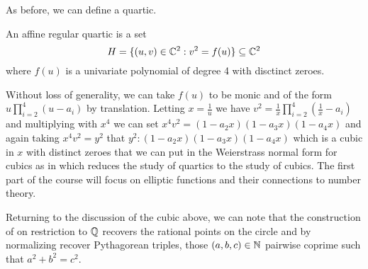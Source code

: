 As before, we can define a quartic. 
\begin{definition}\label{def: affine regular quartic}
    An affine regular quartic is a set 
    $$H=\{(u,v)\in\mathbb{C}^{2}:v^{2}=f(u)\}\subseteq\mathbb{C}^{2}$$
    where $f(u)$ is a univariate polynomial of degree 4 with disctinct zeroes.
\end{definition}
Without loss of generality, we can take $f(u)$ to be monic and of the form $u\prod_{i=2}^{4}(u-a_{i})$ by translation. Letting $x=\frac{1}{u}$ we have $v^{2}=\frac{1}{x}\prod_{i=2}^{4}(\frac{1}{x}-a_{i})$ and multiplying with $x^{4}$ we can set $x^{4}v^{2}=(1-a_{2}x)(1-a_{3}x)(1-a_{4}x)$ and again taking $x^{4}v^{2}=y^{2}$ that $y^{2}:(1-a_{2}x)(1-a_{3}x)(1-a_{4}x)$ which is a cubic in $x$ with distinct zeroes that we can put in the Weierstrass normal form for cubics as in  which reduces the study of quartics to the study of cubics. The first part of the course will focus on elliptic functions and their connections to number theory. 

Returning to the discussion of the cubic above, we can note that the construction of  on restriction to $\mathbb{Q}$ recovers the rational points on the circle and by normalizing recover Pythagorean triples, those $(a,b,c)\in\mathbb{N}$ pairwise coprime such that $a^{2}+b^{2}=c^{2}$. 